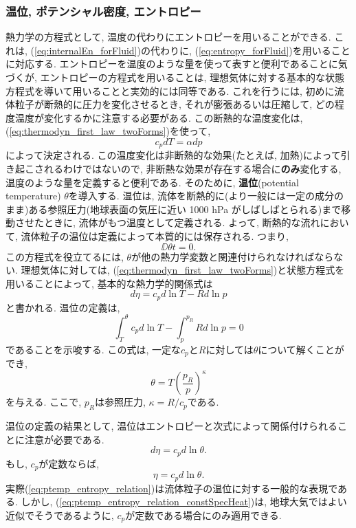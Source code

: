 \subsubsection*{温位, ポテンシャル密度, エントロピー}
熱力学の方程式として, 温度の代わりにエントロピーを用いることができる. 
これは, (\ref{eq:internalEn_forFluid})の代わりに, (\ref{eq:entropy_forFluid})を用いることに対応する. 
エントロピーを温度のような量を使って表すと便利であることに気づくが, 
エントロピーの方程式を用いることは, 理想気体に対する基本的な状態方程式を導いて用いることと実効的には同等である. 
これを行うには, 初めに流体粒子が断熱的に圧力を変化させるとき, それが膨張あるいは圧縮して, 
どの程度温度が変化するかに注意する必要がある. 
この断熱的な温度変化は, (\ref{eq:thermodyn_first_law_twoForms})を使って, 
\begin{equation}
 c_p dT = \alpha dp
\end{equation}
によって決定される. 
この温度変化は非断熱的な効果(たとえば, 加熱)によって引き起こされるわけではないので, 
非断熱な効果が存在する場合に\textbf{のみ}変化する, 温度のような量を定義すると便利である. 
そのために, \textbf{温位}(potential temperature) $\theta$を導入する. 
温位は, 流体を断熱的に(より一般には一定の成分のまま)ある参照圧力(地球表面の気圧に近い 1000 hPa がしばしばとられる)まで移動させたときに, 
流体がもつ温度として定義される. 
よって, 断熱的な流れにおいて, 流体粒子の温位は定義によって本質的には保存される. 
つまり, 
\begin{equation}
 \DD{\theta}{t} = 0. 
\end{equation}
この方程式を役立てるには, $\theta$が他の熱力学変数と関連付けられなければならない. 
理想気体に対しては, 
(\ref{eq:thermodyn_first_law_twoForms})と状態方程式を用いることによって, 
基本的な熱力学的関係式は
\begin{equation}
 d\eta = c_p d\ln{T} -Rd\ln{p}
\end{equation}
と書かれる. 
温位の定義は, 
\begin{equation}
 \int_{T}^\theta c_p d\ln{T} - \int_p^{p_R} R d\ln{p} = 0
\end{equation}
であることを示唆する. 
この式は, 一定な$c_p$と$R$に対しては$\theta$について解くことができ, 
\begin{equation}
 \theta = T\left(\dfrac{p_R}{p}\right)^\kappa
 \label{eq:ptemp_idealGas}
\end{equation}
を与える. 
ここで, $p_R$は参照圧力, $\kappa = R/c_p$である. 

温位の定義の結果として, 温位はエントロピーと次式によって関係付けられることに注意が必要である. 
\begin{equation}
 d\eta = c_p d\ln{\theta}. 
\label{eq:ptemp_entropy_relation}
\end{equation}
もし, $c_p$が定数ならば, 
\begin{equation}
 \eta = c_p d\ln{\theta}. 
 \label{eq:ptemp_entropy_relation_constSpecHeat}
\end{equation}
実際(\ref{eq:ptemp_entropy_relation})は流体粒子の温位に対する一般的な表現である.  
しかし, (\ref{eq:ptemp_entropy_relation_constSpecHeat})は, 
地球大気ではよい近似でそうであるように, $c_p$が定数である場合にのみ適用できる. 

